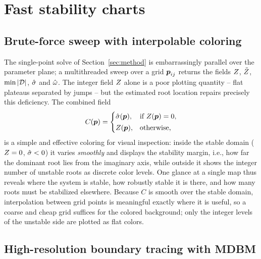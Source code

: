 \section{Fast stability charts}\label{sec:charts}

\subsection{Brute-force sweep with interpolable coloring}\label{sec:coloring}

The single-point solve of Section~\ref{sec:method} is embarrassingly
parallel over the parameter plane; a multithreaded sweep over a grid
$\boldsymbol{p}_{ij}$ returns the fields $Z$, $\tilde{Z}$, $\min|\mathcal{D}|$, $\hat{\sigma}$
and $\hat{\omega}$.
The integer field $Z$ alone is a poor plotting quantity -- flat plateaus
separated by jumps -- but the estimated root location repairs precisely this
deficiency. The combined field
\begin{equation}\label{eq:coloring}
  C(\boldsymbol{p}) =
  \begin{cases}
    \hat{\sigma}(\boldsymbol{p}), & \text{if } Z(\boldsymbol{p}) = 0,\\[2pt]
    Z(\boldsymbol{p}), & \text{otherwise,}
  \end{cases}
\end{equation}
is a simple and effective
coloring for visual inspection: inside the
stable domain ($Z=0$, $\hat{\sigma}<0$) it varies \emph{smoothly} and displays
the stability margin, i.e., how far the dominant root lies from the imaginary
axis, while outside it shows the integer number of unstable roots as
discrete color levels. One glance at a single map thus reveals where the
system is stable, how robustly stable it is there, and how many roots must
be stabilized elsewhere. Because $C$ is smooth over the stable domain,
interpolation between grid points is meaningful exactly where it is useful,
so a coarse and cheap grid suffices for the colored background; only the
integer levels of the unstable side are plotted as flat colors.

\subsection{High-resolution boundary tracing with MDBM}\label{sec:mdbm}

